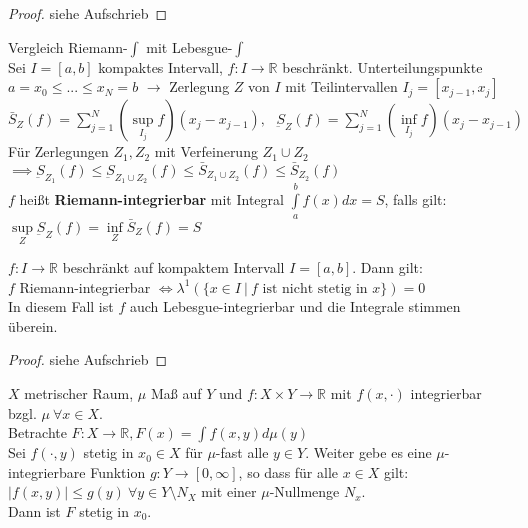   \begin{proof}
    siehe Aufschrieb
  \end{proof}

  \begin{remark}[Anwendung]
    Vergleich Riemann-$\int$ mit Lebesgue-$\int$\\
    Sei $I=[a,b]$ kompaktes Intervall, $f:I \to \mathbb{R}$ beschränkt. Unterteilungspunkte $a = x_0 \leq ... \leq x_N = b$ $\to$ Zerlegung $Z$ von $I$ mit Teilintervallen $I_j = [x_{j-1}, x_j]$\\
    $\bar{S}_Z(f) = \sum\limits_{j=1}^N (\sup\limits_{I_j} f) (x_j - x_{j-1}), \ \ \ \underbar{S}_Z(f)= \sum\limits_{j=1}^N (\inf\limits_{I_j} f)(x_j-x_{j-1})$\\
    Für Zerlegungen $Z_1, Z_2$ mit Verfeinerung $Z_1 \cup Z_2$\\
    $\implies \underbar{S}_{Z_1}(f) \leq \underbar{S}_{Z_1 \cup Z_2}(f) \leq \bar{S}_{Z_1 \cup Z_2}(f) \leq \bar{S}_{Z_2}(f)$\\
    $f$ heißt \textbf{Riemann-integrierbar} mit Integral $\int\limits_a^b f(x) dx = S$, falls gilt:\\
    $\sup\limits_Z \underbar{S}_Z(f) = \inf\limits_Z \bar{S}_Z(f) = S$
  \end{remark}

  \begin{theorem}
    $f: I \to \mathbb{R}$ beschränkt auf kompaktem Intervall $I=[a,b]$. Dann gilt:\\
    $f$ Riemann-integrierbar $\Leftrightarrow \lambda^1(\{x \in I \ | \ f \text{ ist nicht stetig in } x\}) = 0$\\
    In diesem Fall ist $f$ auch Lebesgue-integrierbar und die Integrale stimmen überein.
  \end{theorem}

  \begin{proof}
    siehe Aufschrieb
  \end{proof}

  \begin{theorem}
    $X$ metrischer Raum, $\mu$ Maß auf $Y$ und $f:X \times Y \to \mathbb{R}$ mit $f(x, \cdot)$ integrierbar bzgl. $\mu \ \forall x \in X$.\\
    Betrachte $F: X \to \mathbb{R}, F(x) = \int f(x,y) d\mu(y)$\\
    Sei $f(\cdot, y)$ stetig in $x_0 \in X$ für $\mu$-fast alle $y \in Y$. Weiter gebe es eine $\mu$-integrierbare Funktion $g: Y \to [0, \infty]$, so dass für alle $x \in X$ gilt: $|f(x,y)| \leq g(y) \ \forall y \in Y \setminus N_X$ mit einer $\mu$-Nullmenge $N_x$.\\
    Dann ist $F$ stetig in $x_0$.
  \end{theorem}

